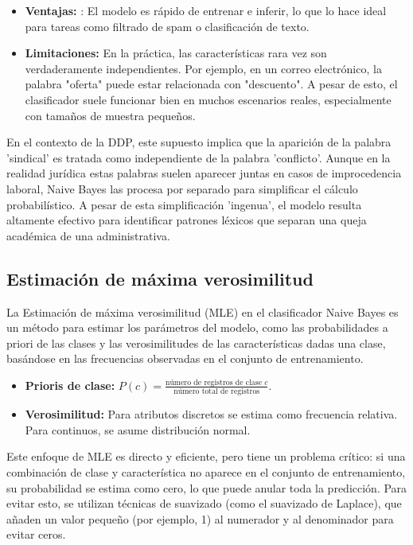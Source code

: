 \begin{itemize}
    \item \textbf{Ventajas:} : El modelo es rápido de entrenar e inferir, lo que lo hace ideal para tareas como filtrado de spam o clasificación de texto. 
    \item \textbf{Limitaciones:} En la práctica, las características rara vez son verdaderamente independientes. Por ejemplo, en un correo electrónico, la palabra "oferta" puede estar relacionada con "descuento". A pesar de esto, el clasificador suele funcionar bien en muchos escenarios reales, especialmente con tamaños de muestra pequeños. 
\end{itemize}

En el contexto de la DDP, este supuesto implica que la aparición de la palabra 'sindical' es tratada como independiente de la palabra 'conflicto'. Aunque en la realidad jurídica estas palabras suelen aparecer juntas en casos de improcedencia laboral, Naive Bayes las procesa por separado para simplificar el cálculo probabilístico. A pesar de esta simplificación 'ingenua', el modelo resulta altamente efectivo para identificar patrones léxicos que separan una queja académica de una administrativa.

\subsection{Estimación de máxima verosimilitud}

La Estimación de máxima verosimilitud (MLE) en el clasificador Naive Bayes es un método para estimar los parámetros del modelo, como las probabilidades a priori de las clases y las verosimilitudes de las características dadas una clase, basándose en las frecuencias observadas en el conjunto de entrenamiento. 
\begin{itemize}
    \item \textbf{Prioris de clase:} $P(c) = \frac{\text{número de registros de clase } c}{\text{número total de registros}}$.
    \item \textbf{Verosimilitud:} Para atributos discretos se estima como frecuencia relativa. Para continuos, se asume distribución normal.
\end{itemize}

Este enfoque de MLE es directo y eficiente, pero tiene un problema crítico: si una combinación de clase y característica no aparece en el conjunto de entrenamiento, su probabilidad se estima como cero, lo que puede anular toda la predicción. Para evitar esto, se utilizan técnicas de suavizado (como el suavizado de Laplace), que añaden un valor pequeño (por ejemplo, 1) al numerador y al denominador para evitar ceros. 


